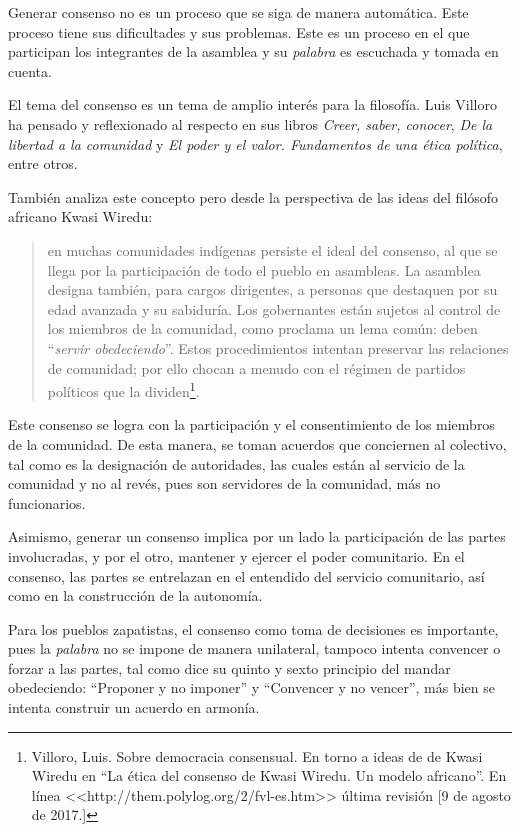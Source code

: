 \documentclass[oneside]{book}
\begin{document}
Generar consenso no es un proceso que se siga de manera automática. Este proceso tiene sus dificultades y sus problemas. Este es un proceso en el que participan los integrantes de la asamblea y su \textit{palabra} es escuchada y tomada en cuenta.

El tema del consenso es un tema de amplio interés para la filosofía. Luis Villoro ha pensado y reflexionado al respecto en sus libros \textit{Creer, saber, conocer}\cite{vill}, \textit{De la libertad a la comunidad}\cite{vi} y \textit{El poder y el valor. Fundamentos de una ética política}\cite{vil}, entre otros.

También analiza este concepto pero desde la perspectiva de las ideas del filósofo africano Kwasi Wiredu:
\begin{quote}
en muchas comunidades indígenas persiste el ideal del consenso, al que se llega por la participación de todo el pueblo en asambleas. La asamblea designa también, para cargos dirigentes, a personas que destaquen por su edad avanzada y su sabiduría. Los gobernantes están sujetos al control de los miembros de la comunidad, como proclama un lema común: deben “\textit{servir obedeciendo}”. Estos procedimientos intentan preservar las relaciones de comunidad; por ello chocan a menudo con el régimen de partidos políticos que la dividen\footnote{Villoro, Luis. Sobre democracia consensual. En torno a ideas de de Kwasi Wiredu en ``La ética del consenso de Kwasi Wiredu. Un modelo africano''. En línea <<http://them.polylog.org/2/fvl-es.htm>> última revisión [9 de agosto de 2017.]}.
\end{quote}

Este consenso se logra con la participación y el consentimiento de los miembros de la comunidad. De esta manera, se toman acuerdos que conciernen al colectivo, tal como es la designación de autoridades, las cuales están al servicio de la comunidad y no al revés, pues son servidores de la comunidad, más no funcionarios.

Asimismo, generar un consenso implica por un lado la participación de las partes involucradas, y por el otro, mantener y ejercer el poder comunitario. En el consenso, las partes se entrelazan en el entendido del servicio comunitario, así como en la construcción de la autonomía.

Para los pueblos zapatistas, el consenso como toma de decisiones es importante, pues la \textit{palabra} no se impone de manera unilateral, tampoco intenta convencer o forzar a las partes, tal como dice su quinto y sexto principio del mandar obedeciendo: “Proponer y no imponer” y “Convencer y no vencer”, más bien se intenta construir un acuerdo en armonía.%
\end{document}

